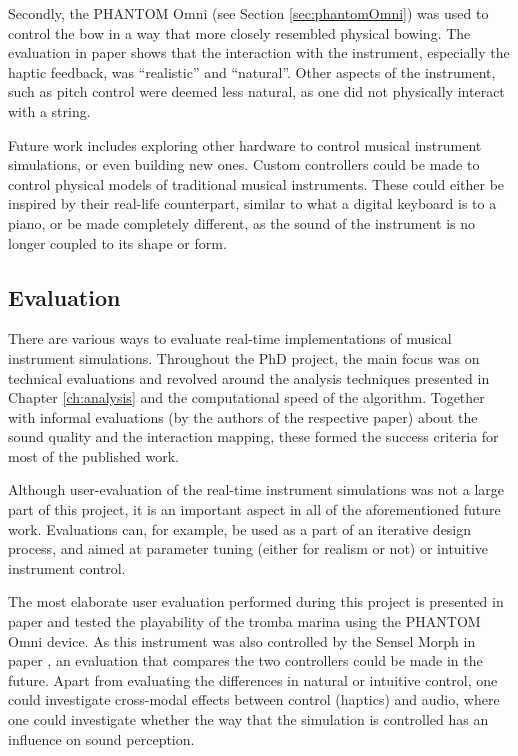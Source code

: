 Secondly, the PHANTOM Omni (see Section \ref{sec:phantomOmni}) was used to control the bow in a way that more closely resembled physical bowing. The evaluation in paper \citeP[E] shows that the interaction with the instrument, especially the haptic feedback, was ``realistic'' and ``natural''. Other aspects of the instrument, such as pitch control were deemed less natural, as one did not physically interact with a string. 

Future work includes exploring other hardware to control musical instrument simulations, or even building new ones. Custom controllers could be made to control physical models of traditional musical instruments. 
These could either be inspired by their real-life counterpart, similar to what a digital keyboard is to a piano, or be made completely different, as the sound of the instrument is no longer coupled to its shape or form.




\subsection{Evaluation}
There are various ways to evaluate real-time implementations of musical instrument simulations. Throughout the PhD project, the main focus was on technical evaluations and revolved around the analysis techniques presented in Chapter \ref{ch:analysis} and the computational speed of the algorithm. Together with informal evaluations (by the authors of the respective paper) about the sound quality and the interaction mapping, these formed the success criteria for most of the published work.

Although user-evaluation of the real-time instrument simulations was not a large part of this project, it is an important aspect in all of the aforementioned future work. Evaluations can, for example, be used as a part of an iterative design process, and aimed at parameter tuning (either for realism or not) or intuitive instrument control.

The most elaborate user evaluation performed during this project is presented in paper \citeP[E] and tested the playability of the tromba marina using the PHANTOM Omni device. As this instrument was also controlled by the Sensel Morph in paper \citeP[D], an evaluation that compares the two controllers could be made in the future. Apart from evaluating the differences in natural or intuitive control, one could investigate cross-modal effects between control (haptics) and audio, where one could investigate whether the way that the simulation is controlled has an influence on sound perception.

